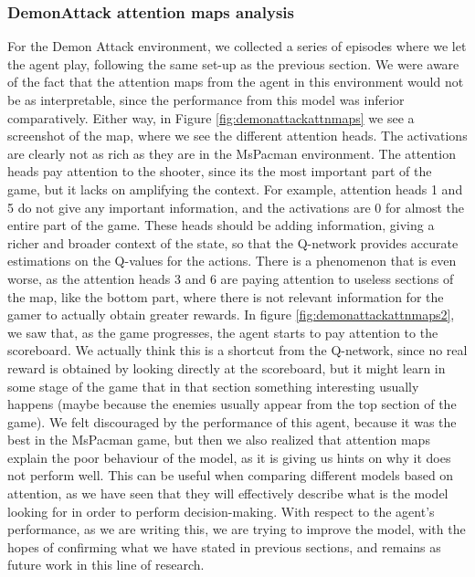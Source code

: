 \subsubsection{DemonAttack attention maps analysis}
For the Demon Attack environment, we collected a series of episodes where we let the agent play, following the same set-up as the previous section. We were aware of the fact that the attention maps from the agent in this environment would not be as interpretable, since the performance from this model was inferior comparatively. Either way, in Figure \ref{fig:demonattackattnmaps} we see a screenshot of the map, where we see the different attention heads. The activations are clearly not as rich as they are in the MsPacman environment. The attention heads pay attention to the shooter, since its the most important part of the game, but it lacks on amplifying the context. For example, attention heads 1 and 5 do not give any important information, and the activations are 0 for almost the entire part of the game. These heads should be adding information, giving a richer and broader context of the state, so that the Q-network provides accurate estimations on the Q-values for the actions. There is a phenomenon that is even worse, as the attention heads 3 and 6 are paying attention to useless sections of the map, like the bottom part, where there is not relevant information for the gamer to actually obtain greater rewards. In figure \ref{fig:demonattackattnmaps2}, we saw that, as the game progresses, the agent starts to pay attention to the scoreboard. We actually think this is a shortcut \cite{Geirhos2020} from the Q-network, since no real reward is obtained by looking directly at the scoreboard, but it might learn in some stage of the game that in that section something interesting usually happens (maybe because the enemies usually appear from the top section of the game). We felt discouraged by the performance of this agent, because it was the best in the MsPacman game, but then we also realized that attention maps explain the poor behaviour of the model, as it is giving us hints on why it does not perform well. This can be useful when comparing different models based on attention, as we have seen that they will effectively describe what is the model looking for in order to perform decision-making. With respect to the agent's performance, as we are writing this, we are trying to improve the model, with the hopes of confirming what we have stated in previous sections, and remains as future work in this line of research.


